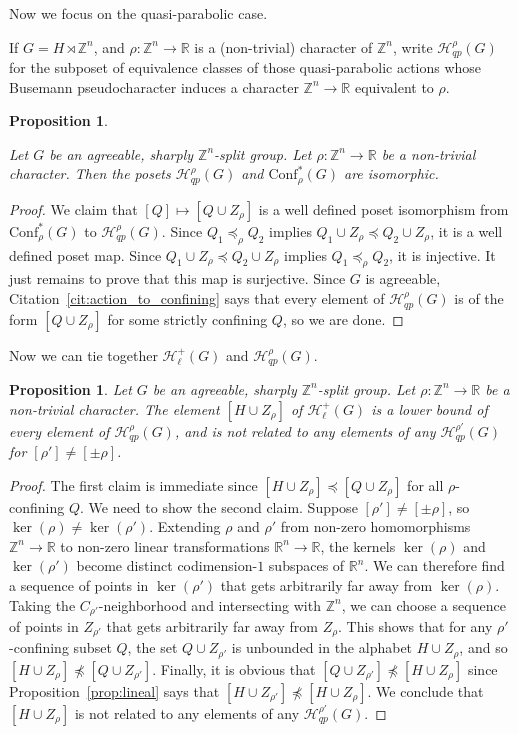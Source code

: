 \documentclass[10pt,a4paper]{article}
\newtheorem{prop}[cdrthm]{Proposition}
\theoremstyle{definition}
\theoremstyle{remark}
\newcommand{\Z}{\mathbb{Z}}
\newcommand{\R}{\mathbb{R}}
\newcommand{\Hyp}{\mathcal{H}}
\newcommand{\Conf}{\mathrm{Conf}}
\theoremstyle{plain}
\begin{document}
Now we focus on the quasi-parabolic case.

If $G = H \rtimes \Z^n$, and $\rho\colon\Z^n\to\R$ is a (non-trivial) character of $\Z^n$, write $\Hyp_{qp}^\rho(G)$ for the subposet of equivalence classes of those quasi-parabolic actions whose Busemann pseudocharacter induces a character $\Z^n\to\R$ equivalent to $\rho$.

\begin{prop}
\label{prop:qp}

Let $G$ be an agreeable, sharply $\Z^n$-split group. Let $\rho \colon \Z^n \to \R$ be a non-trivial character. Then the posets $\Hyp_{qp}^\rho(G)$ and $\Conf^\ast_\rho(G)$ are isomorphic.
\end{prop}

\begin{proof}
We claim that $[Q]\mapsto [Q\cup Z_\rho]$ is a well defined poset isomorphism from $\Conf^\ast_\rho(G)$ to $\Hyp_{qp}^\rho(G)$. Since $Q_1\preceq_\rho Q_2$ implies $Q_1\cup Z_\rho\preceq Q_2\cup Z_\rho$, it is a well defined poset map. Since $Q_1\cup Z_\rho\preceq Q_2\cup Z_\rho$ implies $Q_1\preceq_\rho Q_2$, it is injective. It just remains to prove that this map is surjective. Since $G$ is agreeable, Citation~\ref{cit:action_to_confining} says that every element of $\Hyp_{qp}^\rho(G)$ is of the form $[Q\cup Z_\rho]$ for some strictly confining $Q$, so we are done.
\end{proof}

Now we can tie together $\Hyp_\ell^+(G)$ and $\Hyp_{qp}^\rho(G)$.

\begin{prop}\label{prop:linvsqp}
Let $G$ be an agreeable, sharply $\Z^n$-split group. Let $\rho \colon \Z^n \to \R$ be a non-trivial character. The element $[H\cup Z_\rho]$ of $\Hyp_\ell^+(G)$ is a lower bound of every element of $\Hyp_{qp}^\rho(G)$, and is not related to any elements of any $\Hyp_{qp}^{\rho'}(G)$ for $[\rho']\ne[\pm\rho]$.
\end{prop}

\begin{proof}
The first claim is immediate since $[H\cup Z_\rho]\preccurlyeq [Q\cup Z_\rho]$ for all $\rho$-confining $Q$. We need to show the second claim. Suppose $[\rho']\ne [\pm\rho]$, so $\ker(\rho)\ne\ker(\rho')$. Extending $\rho$ and $\rho'$ from non-zero homomorphisms $\Z^n\to\R$ to non-zero linear transformations $\R^n\to\R$, the kernels $\ker(\rho)$ and $\ker(\rho')$ become distinct codimension-$1$ subspaces of $\R^n$. We can therefore find a sequence of points in $\ker(\rho')$ that gets arbitrarily far away from $\ker(\rho)$. Taking the $C_{\rho'}$-neighborhood and intersecting with $\Z^n$, we can choose a sequence of points in $Z_{\rho'}$ that gets arbitrarily far away from $Z_\rho$. This shows that for any $\rho'$-confining subset $Q$, the set $Q\cup Z_{\rho'}$ is unbounded in the alphabet $H\cup Z_{\rho}$, and so $[H\cup Z_\rho]\not\preccurlyeq[Q\cup Z_{\rho'}]$. Finally, it is obvious that $[Q\cup Z_{\rho'}]\not\preccurlyeq[H\cup Z_\rho]$ since Proposition~\ref{prop:lineal} says that $[H\cup Z_{\rho'}]\not\preccurlyeq [H\cup Z_\rho]$. We conclude that $[H\cup Z_\rho]$ is not related to any elements of any $\Hyp_{qp}^{\rho'}(G)$.
\end{proof}
\end{document}
